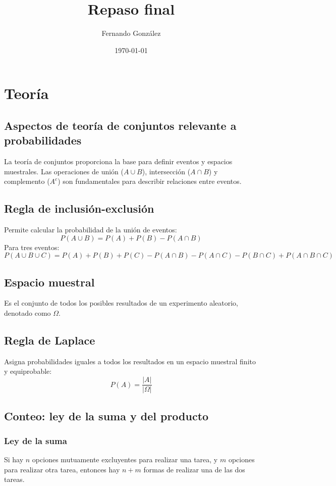 \documentclass[letterpaper, 12pt]{article}
\title{Repaso final}
\author{Fernando González}
\date{\today}
\begin{document}
	
	\maketitle
	
	\section{Teoría}
	
	\subsection{Aspectos de teoría de conjuntos relevante a probabilidades}
	La teoría de conjuntos proporciona la base para definir eventos y espacios muestrales. Las operaciones de unión ($A \cup B$), intersección ($A \cap B$) y complemento ($A^c$) son fundamentales para describir relaciones entre eventos.
	
	\subsection{Regla de inclusión-exclusión}
	Permite calcular la probabilidad de la unión de eventos:
	$$P(A \cup B) = P(A) + P(B) - P(A \cap B)$$
	Para tres eventos:
	$$P(A \cup B \cup C) = P(A) + P(B) + P(C) - P(A \cap B) - P(A \cap C) - P(B \cap C) + P(A \cap B \cap C)$$
	
	\subsection{Espacio muestral}
	Es el conjunto de todos los posibles resultados de un experimento aleatorio, denotado como $\Omega$.
	
	\subsection{Regla de Laplace}
	Asigna probabilidades iguales a todos los resultados en un espacio muestral finito y equiprobable:
	$$P(A) = \frac{|A|}{|\Omega|}$$
	
	\subsection{Conteo: ley de la suma y del producto}
	\subsubsection{Ley de la suma}
	Si hay $n$ opciones mutuamente excluyentes para realizar una tarea, y $m$ opciones para realizar otra tarea, entonces hay $n + m$ formas de realizar una de las dos tareas.
	
\end{document}
